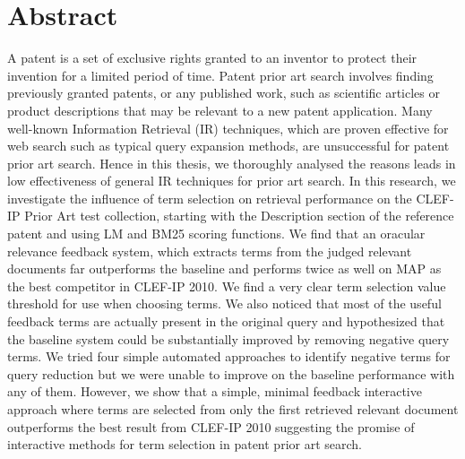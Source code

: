 \chapter*{Abstract}
\vspace{-1em}
A patent is a set of exclusive rights granted to an inventor to protect 
their invention for a limited period of time. Patent prior art search involves 
finding previously granted patents, or any published work, such as scientific 
articles or product descriptions that may be relevant to a new patent application.
Many well-known Information Retrieval (IR) techniques, which are proven effective 
for web search such as typical query expansion methods, are unsuccessful for patent 
prior art search.
Hence in this thesis, we thoroughly analysed the reasons leads in low effectiveness 
of general IR techniques for prior art search.  
In this research, we investigate the influence of term selection on retrieval
performance on the CLEF-IP Prior Art test collection, starting with
the Description section of the reference patent and using LM and BM25
scoring functions. We find that an oracular relevance feedback system,
which extracts terms from the judged relevant documents far
outperforms the baseline and performs twice as well on MAP as the best
competitor in CLEF-IP 2010.  We find a very clear term selection value
threshold for use when choosing terms.  We also noticed that most of
the useful feedback terms are actually present in the original query
and hypothesized that the baseline system could be substantially
improved by removing negative query terms.
We tried four simple automated approaches to identify negative terms
for query reduction but we were unable to improve on the baseline
performance with any of them.  However, we show that a
simple, minimal feedback interactive approach where terms are selected
from only the first retrieved relevant document outperforms the best
result from CLEF-IP 2010 suggesting the promise of interactive methods
for term selection in patent prior art search.

